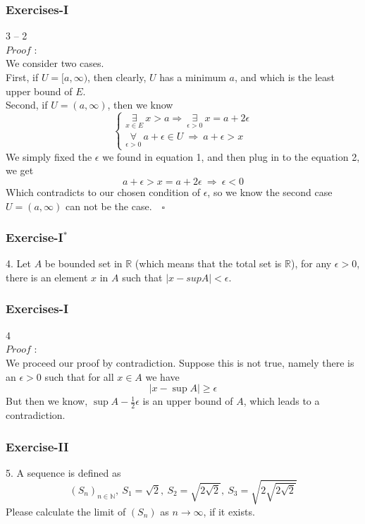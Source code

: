 \documentclass[12pt, t]{beamer}
\begin{document}
\begin{frame}
    \frametitle{Exercises-I}
    3 -- 2\\
    $Proof$ : \\
    We consider two cases.\\
    First, if $U=[a,\infty)$, then clearly, $U$ has a minimum $a$, and which is the least upper bound of $E$.\\
    Second, if $U=(a,\infty)$, then we know
    \begin{equation*}
        \begin{cases}
            \underset{x\in E}{\exists}\ x>a\Rightarrow\ \underset{\epsilon>0}{\exists}\ x=a+2\epsilon \\
            \underset{\epsilon>0}{\forall}\ a+\epsilon\in U\ \Rightarrow\ a+\epsilon>x
        \end{cases}
    \end{equation*}
    We simply fixed the $\epsilon$ we found in equation 1, and then plug in to the equation 2, we get
    \begin{equation*}
        a+\epsilon>x=a+2\epsilon\ \Rightarrow\ \epsilon<0
    \end{equation*}
    Which contradicts to our chosen condition of $\epsilon$, so we know the second case $U=(a,\infty)$ can not be the case.$\quad\square$

\end{frame}


\begin{frame}
    \frametitle{Exercise-I$^*$}
    4. Let $A$ be bounded set in $\mathbb{R}$ (which means that the total set is $\mathbb{R}$), for any $\epsilon>0$,
    there is an element $x$ in $A$ such that $|x-supA|<\epsilon$.
\end{frame}

\begin{frame}
    \frametitle{Exercises-I}
    4\\
    $Proof$ : \\
    \hspace{1em} We proceed our proof by contradiction. Suppose this is not true, namely there is an $\epsilon>0$ such
    that for all $x\in A$ we have
    \begin{equation*}
        |x-\sup A|\geq \epsilon
    \end{equation*}
    But then we know, $\sup A-\frac{1}{2}\epsilon$ is an upper bound of $A$, which leads to a contradiction.
\end{frame}

\begin{frame}
    \frametitle{Exercise-II}
    5. A sequence is defined as
    \begin{equation*}
        (S_n)_{n\in\mathbb{N}},\ S_1=\sqrt{2},\ S_2=\sqrt{2\sqrt{2}},\ S_3=\sqrt{2\sqrt{2\sqrt{2}}}
    \end{equation*}
    Please calculate the limit of $(S_n)$ as $n\rightarrow \infty$, if it exists.
\end{frame}
\end{document}
